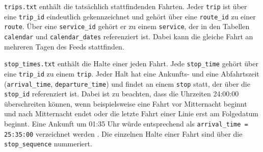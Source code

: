 \documentclass[11pt,pdftex,a4paper]{scrartcl}
\begin{document}
	\texttt{trips.txt} enthält die tatsächlich stattfindenden Fahrten. Jeder \texttt{trip} ist über eine \texttt{trip\_id} eindeutlich gekennzeichnet und gehört über eine \texttt{route\_id} zu einer \texttt{route}. Über eine \texttt{service\_id} gehört er zu einem \texttt{service}, der in den Tabellen \texttt{calendar} und \texttt{calendar\_dates} referenziert ist. Dabei kann die gleiche Fahrt an mehreren Tagen des Feeds stattfinden.
	
	\texttt{stop\_times.txt} enthält die Halte einer jeden Fahrt. Jede \texttt{stop\_time} gehört über eine \texttt{trip\_id} zu einem \texttt{trip}. Jeder Halt hat eine Ankunfts- und eine Abfahrtszeit (\texttt{arrival\_time}, \texttt{departure\_time}) und findet an einem \texttt{stop} statt, der über die \texttt{stop\_id} referenziert ist. Dabei ist zu beachten, dass die Uhrzeiten 24:00:00 überschreiten können, wenn beispielsweise eine Fahrt vor Mitternacht beginnt und nach Mitternacht endet oder die letzte Fahrt einer Linie erst am Folgedatum beginnt. Eine Ankunft um 01:35 Uhr würde entsprechend als \texttt{arrival\_time = 25:35:00} verzeichnet werden \parencite[vgl.][51: Das Ende eines Betriebstages variiert zwischen Räumen]{kcwgmbhMethodikUndEmpfehlungen2024}. Die einzelnen Halte einer Fahrt sind über die \texttt{stop\_sequence} nummeriert.
	
\end{document}
